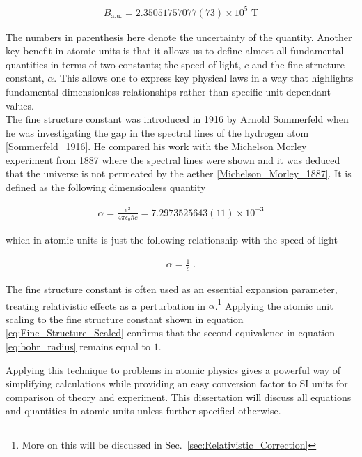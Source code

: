         \begin{align}
            B_{\text{a.u.}} = 2.35051757077(73) \times 10^5 \text{ T}
        \end{align}

        The numbers in parenthesis here denote the uncertainty of the quantity. Another key benefit in atomic units is that it allows us to define almost all fundamental quantities in terms of two constants; the speed of light, $c$ and the fine structure constant, $\alpha$. This allows one to express key physical laws in a way that highlights fundamental dimensionless relationships rather than specific unit-dependant values.\\

        The fine structure constant was introduced in 1916 by Arnold Sommerfeld when he was investigating the gap in the spectral lines of the hydrogen atom \ref{Sommerfeld_1916}. He compared his work with the Michelson Morley experiment from 1887 where the spectral lines were shown and it was deduced that the universe is not permeated by the aether \ref{Michelson_Morley_1887}. It is defined as the following dimensionless quantity

        \begin{align}
            \alpha = \frac{e^2}{4\pi \epsilon_0 \hbar c} = 7.2973525643(11) \times 10^{-3}   
        \end{align}

        \noindent which in atomic units is just the following relationship with the speed of light 

        \begin{align}
            \alpha = \frac{1}{c} \label{eq:Fine_Structure_Scaled}\;.
        \end{align}

        \noindent The fine structure constant is often used as an essential expansion parameter, treating relativistic effects as a perturbation in $\alpha$.\footnote{More on this will be discussed in Sec.~\ref{sec:Relativistic_Correction}} Applying the atomic unit scaling to the fine structure constant shown in equation \eqref{eq:Fine_Structure_Scaled} confirms that the second equivalence in equation \eqref{eq:bohr_radius} remains equal to $1$. 

        Applying this technique to problems in atomic physics gives a powerful way of simplifying calculations while providing an easy conversion factor to SI units for comparison of theory and experiment. This dissertation will discuss all equations and quantities in atomic units unless further specified otherwise.


